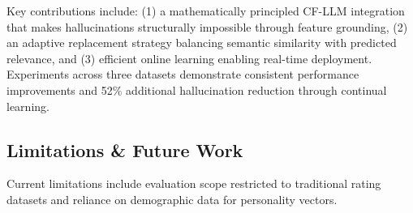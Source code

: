 \documentclass[acmsmall]{acmart}
\begin{document}
Key contributions include: (1) a mathematically principled CF-LLM integration that makes hallucinations structurally impossible through feature grounding, (2) an adaptive replacement strategy balancing semantic similarity with predicted relevance, and (3) efficient online learning enabling real-time deployment. Experiments across three datasets demonstrate consistent performance improvements and 52\% additional hallucination reduction through continual learning.

\subsection{Limitations \& Future Work}
Current limitations include evaluation scope restricted to traditional rating datasets and reliance on demographic data for personality vectors. 
\end{document}
